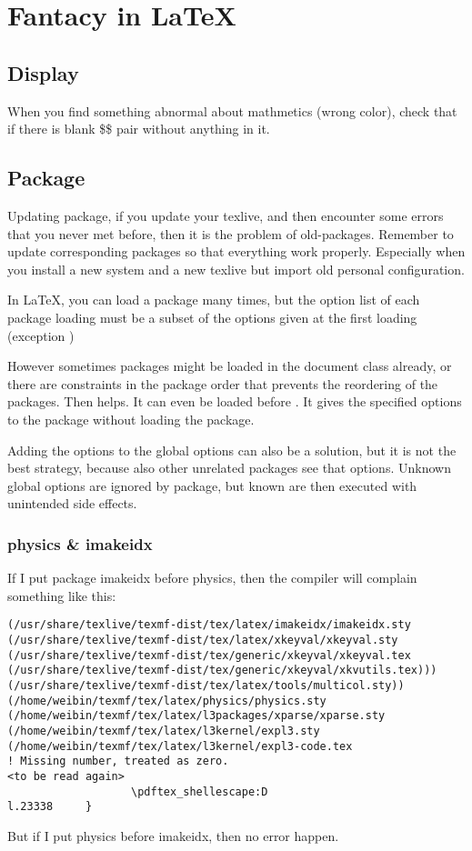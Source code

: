 \chapter{Fantacy in \LaTeX{}}

\section{Display}
When you find something abnormal about mathmetics (wrong color), check that
if there is blank \$\$ pair without anything in it.

\section{Package}
Updating package, if you update your texlive, and then encounter some errors
that you never met before, then it is the problem of old-packages. Remember 
to update corresponding packages so that everything work properly. Especially
when you install a new system and a new texlive but import old personal configuration.

In \LaTeX, you can load a package many times, but the option list of each 
package loading must be a subset of the options given at the first loading (exception
)

However sometimes packages might be loaded in the document class already, or
there are constraints in the package order that prevents the reordering of the 
packages. Then  helps. It can even
be loaded before . It gives the specified 
options to the package without loading the package.

Adding the options to the global options can also be a solution, but it is not the
best strategy, because also other unrelated packages see that options. Unknown global 
options are ignored by package, but known are then executed with unintended side effects.

\subsection{physics \& imakeidx}
If I put package imakeidx before physics, then the compiler will complain
something like this:
\begin{verbatim}
(/usr/share/texlive/texmf-dist/tex/latex/imakeidx/imakeidx.sty
(/usr/share/texlive/texmf-dist/tex/latex/xkeyval/xkeyval.sty
(/usr/share/texlive/texmf-dist/tex/generic/xkeyval/xkeyval.tex
(/usr/share/texlive/texmf-dist/tex/generic/xkeyval/xkvutils.tex)))
(/usr/share/texlive/texmf-dist/tex/latex/tools/multicol.sty))
(/home/weibin/texmf/tex/latex/physics/physics.sty
(/home/weibin/texmf/tex/latex/l3packages/xparse/xparse.sty
(/home/weibin/texmf/tex/latex/l3kernel/expl3.sty
(/home/weibin/texmf/tex/latex/l3kernel/expl3-code.tex
! Missing number, treated as zero.
<to be read again> 
                   \pdftex_shellescape:D 
l.23338	    }
\end{verbatim}
But if I put physics before imakeidx, then no error happen.

